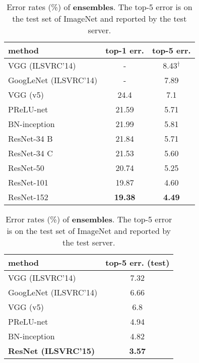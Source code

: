 \begin{table}[t]
\setlength{\tabcolsep}{8pt}
\small
\begin{center}
\begin{tabular}{l|c c}
\hline
\footnotesize method & \footnotesize top-1 err. & \footnotesize top-5 err.\\
\hline
VGG \cite{Simonyan2015} (ILSVRC'14) & - & 8.43$^{\dag}$\\
GoogLeNet \cite{Szegedy2015} (ILSVRC'14) & - & 7.89\\
\hline
VGG \cite{Simonyan2015} \footnotesize (v5) & 24.4 & 7.1\\
PReLU-net \cite{He2015} & 21.59 & 5.71 \\
BN-inception \cite{Ioffe2015} & 21.99 & 5.81 \\\hline
ResNet-34 B & 21.84 & 5.71 \\
ResNet-34 C & 21.53 & 5.60 \\
ResNet-50 & 20.74 & 5.25 \\
ResNet-101 & 19.87 & 4.60 \\
ResNet-152 & \textbf{19.38} & \textbf{4.49} \\
\hline
\end{tabular}
\end{center}
\vspace{-.5em}
\caption{Error rates (\%) of \textbf{single-model} results on the ImageNet validation set (except $^{\dag}$ reported on the test set).}
\label{tab:single}
\setlength{\tabcolsep}{12pt}
\small
\begin{center}
\begin{tabular}{l|c}
\hline
\footnotesize method & top-5 err. (\textbf{test}) \\
\hline
VGG \cite{Simonyan2015} (ILSVRC'14) & 7.32\\
GoogLeNet \cite{Szegedy2015} (ILSVRC'14) & 6.66\\
\hline
VGG \cite{Simonyan2015} \footnotesize (v5) & 6.8 \\
PReLU-net \cite{He2015} & 4.94 \\
BN-inception \cite{Ioffe2015} & 4.82 \\\hline
\textbf{ResNet (ILSVRC'15)} & \textbf{3.57} \\
\hline
\end{tabular}
\end{center}
\vspace{-.5em}
\caption{Error rates (\%) of \textbf{ensembles}. The top-5 error is on the test set of ImageNet and reported by the test server.}
\label{tab:ensemble}
\end{table}

